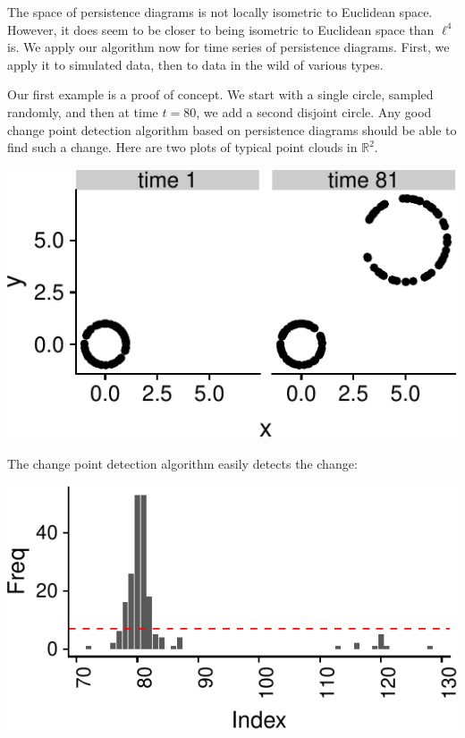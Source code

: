 \documentclass[smallextended]{svjour3}       %
\begin{document}
The space of persistence diagrams is not locally isometric to Euclidean
space. However, it does seem to be closer to being isometric to
Euclidean space than \(\ell^4\) is. We apply our algorithm now for time
series of persistence diagrams. First, we apply it to simulated data,
then to data in the wild of various types.

Our first example is a proof of concept. We start with a single circle,
sampled randomly, and then at time \(t = 80\), we add a second disjoint
circle. Any good change point detection algorithm based on persistence
diagrams should be able to find such a change. Here are two plots of
typical point clouds in \(\mathbb{R}^2\).

\begin{center}\includegraphics{springer_template_files/figure-latex/chunk_6-1} \end{center}

The change point detection algorithm easily detects the change:

\begin{center}\includegraphics{springer_template_files/figure-latex/unnamed-chunk-1-1} \end{center}
\end{document}
